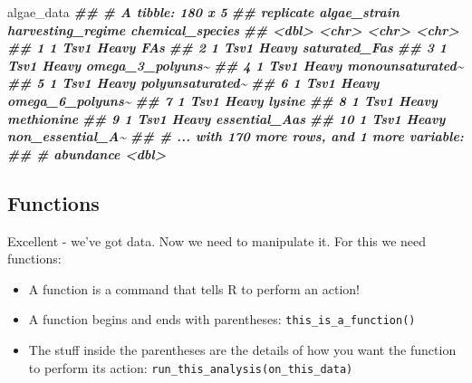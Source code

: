 \documentclass[
]{krantz}
\newenvironment{Shaded}{\begin{snugshade}}{\end{snugshade}}
\newcommand{\DocumentationTok}[1]{\textcolor[rgb]{0.56,0.35,0.01}{\textbf{\textit{#1}}}}
\newcommand{\NormalTok}[1]{#1}
\providecommand{\tightlist}{%
  \setlength{\itemsep}{0pt}\setlength{\parskip}{0pt}}
\begin{document}
\begin{Shaded}
\begin{Highlighting}[]
\NormalTok{algae\_data}
\DocumentationTok{\#\# \# A tibble: 180 x 5}
\DocumentationTok{\#\#    replicate algae\_strain harvesting\_regime chemical\_species}
\DocumentationTok{\#\#        \textless{}dbl\textgreater{} \textless{}chr\textgreater{}        \textless{}chr\textgreater{}             \textless{}chr\textgreater{}           }
\DocumentationTok{\#\#  1         1 Tsv1         Heavy             FAs             }
\DocumentationTok{\#\#  2         1 Tsv1         Heavy             saturated\_Fas   }
\DocumentationTok{\#\#  3         1 Tsv1         Heavy             omega\_3\_polyuns\textasciitilde{}}
\DocumentationTok{\#\#  4         1 Tsv1         Heavy             monounsaturated\textasciitilde{}}
\DocumentationTok{\#\#  5         1 Tsv1         Heavy             polyunsaturated\textasciitilde{}}
\DocumentationTok{\#\#  6         1 Tsv1         Heavy             omega\_6\_polyuns\textasciitilde{}}
\DocumentationTok{\#\#  7         1 Tsv1         Heavy             lysine          }
\DocumentationTok{\#\#  8         1 Tsv1         Heavy             methionine      }
\DocumentationTok{\#\#  9         1 Tsv1         Heavy             essential\_Aas   }
\DocumentationTok{\#\# 10         1 Tsv1         Heavy             non\_essential\_A\textasciitilde{}}
\DocumentationTok{\#\# \# ... with 170 more rows, and 1 more variable:}
\DocumentationTok{\#\# \#   abundance \textless{}dbl\textgreater{}}
\end{Highlighting}
\end{Shaded}

\hypertarget{functions}{%
\subsection{Functions}\label{functions}}

Excellent - we've got data. Now we need to manipulate it. For this we need functions:

\begin{itemize}
\tightlist
\item
  A function is a command that tells R to perform an action!
\item
  A function begins and ends with parentheses: \texttt{this\_is\_a\_function()}
\item
  The stuff inside the parentheses are the details of how you want the function to perform its action: \texttt{run\_this\_analysis(on\_this\_data)}
\end{itemize}
\end{document}
